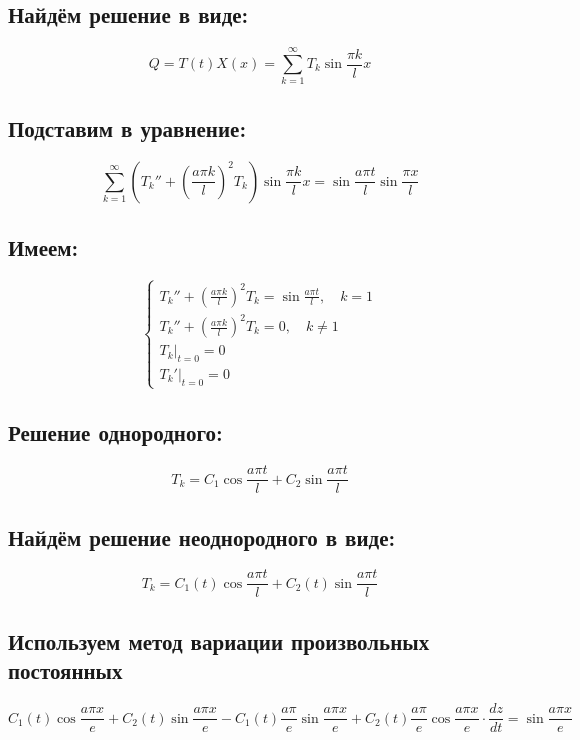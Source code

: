 \documentclass[a4paper,12pt]{article}
\begin{document}
\subsection*{Найдём решение в виде:}

$$Q = T(t) X(x) = \sum_{k=1}^\infty T_k \sin \frac{\pi k}{l} x$$

\subsection*{Подставим в уравнение:}

$$\sum_{k=1}^\infty \left( T_k'' + \left( \frac{a \pi k}{l} \right)^2 T_k \right) \sin \frac{\pi k}{l} x = \sin \frac{a \pi t}{l} \sin \frac{\pi x}{l}$$

\subsection*{Имеем:}

$$\begin{cases}
T_k'' + \left( \frac{a \pi k}{l} \right)^2 T_k = \sin \frac{a \pi t}{l}, \quad k = 1 \\
T_k'' + \left( \frac{a \pi k}{l} \right)^2 T_k = 0, \quad k \ne 1 \\
T_k|_{t=0} = 0 \\
T_k'|_{t=0} = 0
\end{cases}$$

\subsection*{Решение однородного:}

$$T_k = C_1 \cos \frac{a \pi t}{l} + C_2 \sin \frac{a \pi t}{l}$$

\subsection*{Найдём решение неоднородного в виде:}

$$T_k = C_1(t) \cos \frac{a \pi t}{l} + C_2(t) \sin \frac{a \pi t}{l}$$

\subsection*{Используем метод вариации произвольных постоянных}

$$C_1(t) \cos \frac{a \pi x}{e} + C_2(t) \sin \frac{a \pi x}{e} - C_1(t) \frac{a \pi}{e} \sin \frac{a \pi x}{e} + C_2(t) \frac{a \pi}{e} \cos \frac{a \pi x}{e} \cdot \frac{dz}{dt} = \sin \frac{a \pi x}{e}$$
\end{document}
